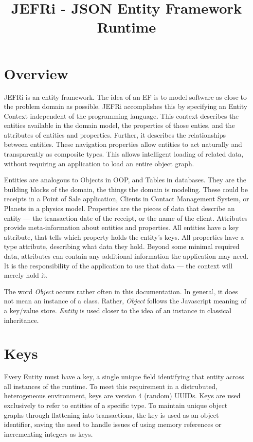 \documentclass{article}
\begin{document}
\title{JEFRi - JSON Entity Framework Runtime}
\maketitle
\tableofcontents
\newpage
\linespread{1.6}

\section{Overview}
JEFRi is an entity framework. The idea of an EF is to model software as close to
the problem domain as possible. JEFRi accomplishes this by specifying an Entity
Context independent of the programming language. This context describes the
entities available in the domain model, the properties of those enties, and the
attributes of entities and properties. Further, it describes the relationships
between entities. These navigation properties allow entities to act naturally
and transparently as composite types. This allows intelligent loading of related
data, without requiring an application to load an entire object graph.

Entities are analogous to Objects in OOP, and Tables in databases. They are the
building blocks of the domain, the things the domain is modeling. These could be
receipts in a Point of Sale application, Clients in Contact Management System,
or Planets in a physics model. Properties are the pieces of data that describe
an entity --- the transaction date of the receipt, or the name of the client.
Attributes provide meta-information about entities and properties. All entities
have a key attribute, that tells which property holds the entity's keys. All
properties have a type attribute, describing what data they hold. Beyond some
minimal required data, attributes can contain any additional information the
application may need. It is the responsibility of the application to use that
data --- the context will merely hold it.

The word {\sl Object} occurs rather often in this documentation. In general, it
does not mean an instance of a class. Rather, {\sl Object} follows the
Javascript meaning of a key/value store. {\sl Entity} is used closer to the idea
of an instance in classical inheritance.

\section{Keys}
Every Entity must have a key, a single unique field identifying that entity
across all instances of the runtime. To meet this requirement in a distrubuted,
heterogeneous environment, keys are version 4 (random) UUIDs.
Keys are used exclusively to refer to entities of a specific type. To maintain
unique object graphs through flattening into transactions, the key is used as an
object identifier, saving the need to handle issues of using memory references
or incrementing integers as keys.
\end{document}
